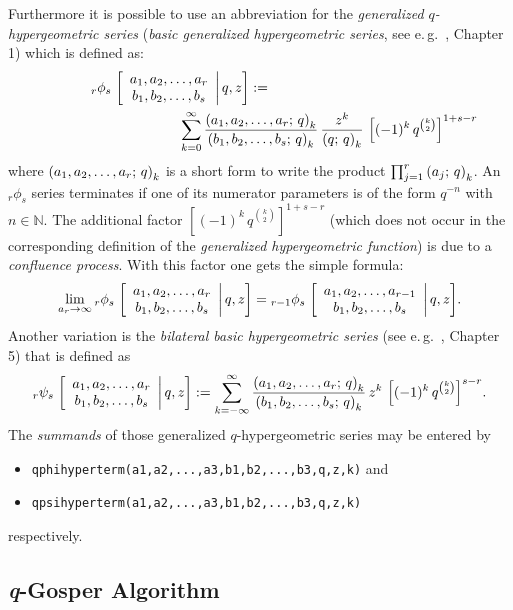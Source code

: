 Furthermore it is possible to use an abbreviation for the
{\sl generalized $q$-hypergeometric series}
({\sl basic generalized hypergeometric series}, 
see e.\,g.\ \cite{GasperRahman:90}, Chapter 1) which is defined as:
\begin{eqnarray*}
	\qphihyp{r}{s}{a_1,a_2,\ldots,a_r}{b_1,b_2,\ldots,b_s}{z}:= 
	\hspace{15em}\\ \hspace{10em}
	\sum_{k=0}^{\infty}{\frac{\qfac{a_1,a_2,\ldots,a_r}{k}}
	{\qfac{b_1,b_2,\ldots,b_s}{k}}
	\,\frac{z^k}{\qfac{q}{k}}\,\left[(-1)^k\,
	q^{\binom{k}{2}}\right]^{1+s-r}}
\end{eqnarray*}
where $\left(a_1,a_2,\ldots,a_r;\,q\right)_{k}$ is a short form to write the
product $\prod_{j=1}^r{\left(a_j;\,q\right)_{k}}$. An ${}_r\phi_s$ series
terminates if one of its numerator parameters is of the form
$q^{-n}$ with $n\in\mathbb{N}$. The additional factor
$\left[(-1)^k\,q^{\binom{k}{2}}\right]^{1+s-r}$ (which does not
occur in the corresponding definition of the {\sl generalized
hypergeometric function}) is due to a {\sl confluence process}.
With this factor one gets the simple formula:
\[
	\lim_{a_r\rightarrow\infty}{{}_{r}\phi_{s}\left.\left[\begin{array}{c} a_1,a_2,\ldots,a_r \\ b_1,b_2,\ldots,b_s \end{array}\right|q,z\right]} = 
	{{}_{r-1}\phi_{s}\left.\left[\begin{array}{c} a_1,a_2,\ldots,a_{r-1} \\ b_1,b_2,\ldots,b_s \end{array}\right|q,z\right]}.
\]
Another variation is the {\sl bilateral basic hypergeometric
series} (see e.\,g.\ \cite{GasperRahman:90}, Chapter 5) that is defined as
\[
	{}_{r}\psi_{s}\left.\left[\begin{array}{c} a_1,a_2,\ldots,a_r \\ b_1,b_2,\ldots,b_s \end{array}\right|q,z\right]:=
	\sum_{k=-\infty}^{\infty}{\frac{\left(a_1,a_2,\ldots,a_r;\,q\right)_{k}}
	{\left(b_1,b_2,\ldots,b_s;\,q\right)_{k}}\,z^k\,
	\left[(-1)^k\,q^{\binom{k}{2}}\right]^{s-r}}.
\]
The \textsl{summands} of those generalized $q$-hypergeometric series may
be entered by
\begin{itemize}
	\item \texttt{qphihyperterm({a1,a2,...,a3},{b1,b2,...,b3},q,z,k)}
		and
	\item \texttt{qpsihyperterm({a1,a2,...,a3},{b1,b2,...,b3},q,z,k)}
\end{itemize}
respectively.


\subsection{\textsl{q}-Gosper Algorithm}
\label{qgosper}

